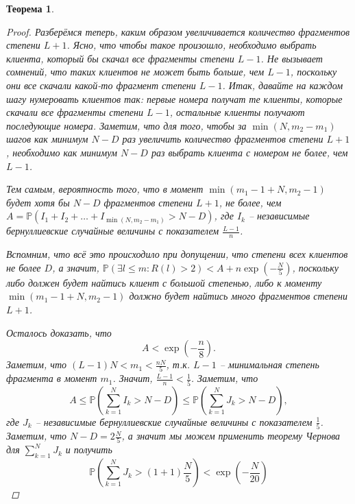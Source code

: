 \documentclass{matmex-diploma-custom}
\newcommand{\PRob}{\mathbb P}
\newcommand{\leqs}{\leqslant}
\newtheorem{theorem}{Теорема}
\theoremstyle{named}
\begin{document}
\begin{theorem}
\begin{proof}
Разберёмся теперь, каким образом увеличивается количество фрагментов степени $L+1$. 
Ясно, что чтобы такое произошло, необходимо выбрать клиента, который бы скачал все фрагменты степени $L-1$. 
Не вызывает сомнений, что таких клиентов не может быть больше, чем $L-1$, поскольку они все скачали какой-то фрагмент степени $L-1$.
Итак, давайте на каждом шагу нумеровать клиентов так: первые номера получат те клиенты, 
которые скачали все фрагменты степени $L-1$, остальные клиенты получают последующие номера. 
Заметим, что для того, чтобы за $\min(N, m_2 - m_1)$ шагов как минимум $N-D$ раз увеличить количество фрагментов степени $L+1$,
необходимо как минимум $N-D$ раз выбрать клиента с номером не более, чем $L-1$.

Тем самым, вероятность того, что в момент $\min(m_1 - 1 + N, m_2 - 1)$ будет хотя бы $N-D$ фрагментов степени $L+1$, 
не более, чем $ A = \PRob(I_1 + I_2 + \dots + I_{\min(N, m_2 - m_1)} > N - D)$, 
где $I_k$ -- независимые бернуллиевские случайные величины с показателем $\frac{L-1}{n}$.

Вспомним, что всё это происходило при допущении, что степени всех клиентов не более $D$, 
а значит, $\PRob\left(\exists l \leqs m : R(l) > 2 \right) < A +  n\exp\left(-\frac{N}{5}\right)$, 
поскольку либо должен будет найтись клиент с большой степенью, 
либо к моменту $\min(m_1 - 1 + N, m_2 - 1)$ должно будет найтись много фрагментов степени $L+1$.

Осталось доказать, что 
\begin{equation}
A < \exp\left(- \frac{n}{8}\right).
\end{equation}
Заметим, что $(L-1) N < m_1 < \frac{nN}{5}$, т.к. $L-1$ -- минимальная степень фрагмента в момент $m_1$.
Значит, $\frac{L-1}{n} < \frac{1}{5}$. Заметим, что
\begin{equation}
A \leqs \PRob\left(\sum_{k = 1}^N I_k > N - D\right) \leqs \PRob\left(\sum_{k = 1}^N J_k > N - D\right),
\end{equation}
где $J_k$ -- независимые бернуллиевские случайные величины с показателем $\frac{1}{5}$. 
Заметим, что $N - D = 2 \frac{N}{5}$, а значит мы можем применить 
теорему Чернова для $\sum\limits_{k = 1}^N J_k$ и получить
\begin{equation}
\PRob\left(\sum_{k = 1}^N J_k > (1 + 1) \frac{N}{5}\right) < \exp\left( - \frac{N}{20}\right)
\end{equation}

\end{proof}

\end{theorem}
\end{document}
